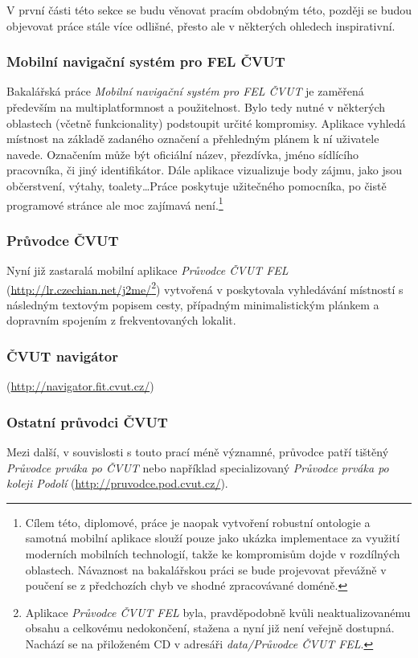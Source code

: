 V první části této sekce se budu věnovat pracím obdobným této, později se budou objevovat práce stále více odlišné, přesto ale v některých ohledech inspirativní.

\subsubsection{Mobilní navigační systém pro FEL ČVUT}
Bakalářská práce \emph{Mobilní navigační systém pro FEL ČVUT} \cite{Bakalarka} je zaměřená především na multiplatformnost a použitelnost. Bylo tedy nutné v některých oblastech (včetně funkcionality) podstoupit určité kompromisy. Aplikace vyhledá místnost na základě zadaného označení a přehledným plánem k ní uživatele navede. Označením může být oficiální název, přezdívka, jméno sídlícího pracovníka, či jiný identifikátor. Dále aplikace vizualizuje body zájmu, jako jsou občerstvení, výtahy, toalety\dots Práce poskytuje užitečného pomocníka, po čistě programové stránce ale moc zajímavá není.\footnote{Cílem této, diplomové, práce je naopak vytvoření robustní ontologie a samotná mobilní aplikace slouží pouze jako ukázka implementace za využití moderních mobilních technologií, takže ke kompromisům dojde v rozdílných oblastech. Návaznost na bakalářskou práci se bude projevovat převážně v poučení se z předchozích chyb ve shodné zpracovávané doméně.}

\subsubsection{Průvodce ČVUT}
Nyní již zastaralá mobilní aplikace \emph{Průvodce ČVUT FEL} (\url{http://lr.czechian.net/j2me/}\footnote{Aplikace \emph{Průvodce ČVUT FEL} byla, pravděpodobně kvůli neaktualizovanému obsahu a celkovému nedokončení, stažena a nyní již není veřejně dostupná. Nachází se na přiloženém \gls{CD} v adresáři \textit{data/Průvodce ČVUT FEL}. }) vytvořená v  poskytovala vyhledávání místností s následným textovým popisem cesty, případným minimalistickým plánkem a dopravním spojením z frekventovaných lokalit.

\subsubsection{ČVUT navigátor}
 (\url{http://navigator.fit.cvut.cz/})

\subsubsection{Ostatní průvodci ČVUT}
Mezi další, v souvislosti s touto prací méně významné, průvodce patří tištěný \emph{Průvodce prváka po ČVUT} \cite{PruvodcePrvaka} nebo například specializovaný \emph{Průvodce prváka po koleji Podolí} (\url{http://pruvodce.pod.cvut.cz/}).

